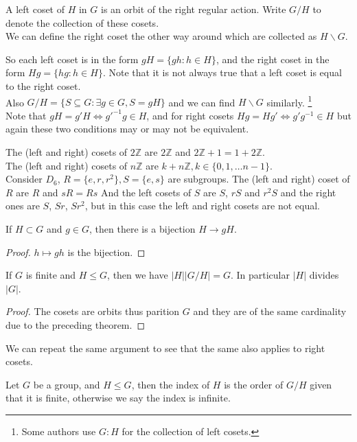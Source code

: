 \begin{definition}
    A left coset of $H$ in $G$ is an orbit of the right regular action.
    Write $G/H$ to denote the collection of these cosets.\\
    We can define the right coset the other way around which are collected as $H\backslash G$.
\end{definition}
So each left coset is in the form $gH=\{gh:h\in H\}$, and the right coset in the form $Hg=\{hg:h\in H\}$.
Note that it is not always true that a left coset is equal to the right coset.\\
Also $G/H=\{S\subseteq G:\exists g\in G,S=gH\}$ and we can find $H\backslash G$ similarly.
\footnote{Some authors use $G:H$ for the collection of left cosets.}\\
Note that $gH=g'H\iff g'^{-1}g\in H$, and for right cosets $Hg=Hg'\iff g'g^{-1}\in H$ but again these two conditions may or may not be equivalent.
\begin{example}
    The (left and right) cosets of $2\mathbb Z$ are $2\mathbb Z$ and $2\mathbb Z+1=1+2\mathbb Z$.\\
    The (left and right) cosets of $n\mathbb Z$ are $k+n\mathbb Z, k\in\{0,1,\ldots n-1\}$.\\
    Consider $D_6$, $R=\{e,r,r^2\}, S=\{e,s\}$ are subgroups.
    The (left and right) coset of $R$ are $R$ and $sR=Rs$
    And the left cosets of $S$ are $S$, $rS$ and $r^2S$ and the right ones are $S$, $Sr$, $Sr^2$, but in this case the left and right cosets are not equal.
\end{example}
\begin{theorem}
    If $H\subset G$ and $g\in G$, then there is a bijection $H\to gH$.
\end{theorem}
\begin{proof}
    $h\mapsto gh$ is the bijection.
\end{proof}
\begin{corollary}\label{lagrange}
    If $G$ is finite and $H\le G$, then we have $|H||G/H|=G$.
    In particular $|H|$ divides $|G|$.
\end{corollary}
\begin{proof}
    The cosets are orbits thus parition $G$ and they are of the same cardinality due to the preceding theorem.
\end{proof}
We can repeat the same argument to see that the same also applies to right cosets.
\begin{definition}
    Let $G$ be a group, and $H\le G$, then the index of $H$ is the order of $G/H$ given that it is finite, otherwise we say the index is infinite.
\end{definition}
